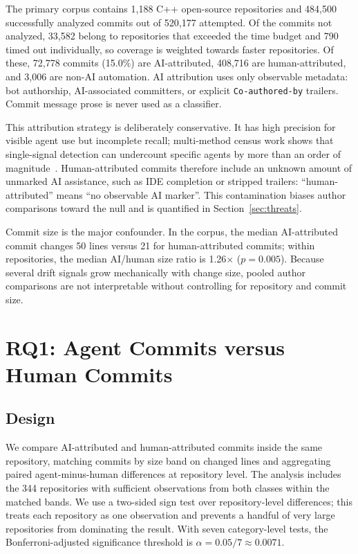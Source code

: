 \documentclass[sigplan,11pt,nonacm=true]{acmart}
\newcommand{\x}{$\times$}
\begin{document}
The primary corpus contains 1{,}188 C++ open-source repositories and 484{,}500
successfully analyzed commits out of 520{,}177 attempted. Of the commits not
analyzed, 33{,}582 belong to repositories that exceeded the time budget and
790 timed out individually, so coverage is weighted towards faster
repositories. Of these, 72{,}778
commits (15.0\%) are AI-attributed, 408{,}716 are human-attributed, and
3{,}006 are non-AI automation. AI attribution uses only observable metadata:
bot authorship, AI-associated committers, or explicit \texttt{Co-authored-by}
trailers. Commit message prose is never used as a classifier.

This attribution strategy is deliberately conservative. It has high precision
for visible agent use but incomplete recall; multi-method census work shows
that single-signal detection can undercount specific agents by more than an
order of magnitude~\cite{khosravani2026census}. Human-attributed commits
therefore include an unknown amount of unmarked AI assistance, such as IDE
completion or stripped trailers: ``human-attributed'' means ``no observable
AI marker''. This contamination biases author comparisons
toward the null and is quantified in Section~\ref{sec:threats}.

Commit size is the major confounder. In the corpus, the median AI-attributed
commit changes 50 lines versus 21 for human-attributed commits; within
repositories, the median AI/human size ratio is 1.26\x{} ($p=0.005$). Because
several drift signals grow mechanically with change size, pooled author
comparisons are not interpretable without controlling for repository and
commit size.

\section{RQ1: Agent Commits versus Human Commits}
\label{sec:rq1}

\subsection{Design}

We compare AI-attributed and human-attributed commits inside the same
repository, matching commits by size band on changed lines and aggregating
paired agent-minus-human differences at repository level. The analysis
includes the 344 repositories with sufficient observations from both classes
within the matched bands. We use a two-sided sign test over repository-level
differences; this treats each repository as one observation and prevents a
handful of very large repositories from dominating the result. With seven
category-level tests, the Bonferroni-adjusted significance threshold is
$\alpha = 0.05/7 \approx 0.0071$.
\end{document}
